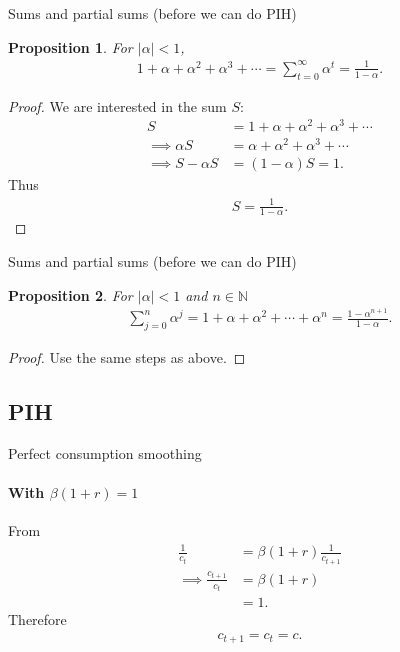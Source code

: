 \documentclass[presentation,dvipsnames]{beamer}
\newtheorem{prop}{Proposition}
\begin{document}
\begin{frame}[label=sec-2-3]{Sums and partial sums (before we can do PIH)}
\begin{prop}
\label{prop:2}
For $|\alpha| < 1$,
\begin{align*}
1 + \alpha + \alpha^{2} + \alpha^{3} + \cdots = \sum\limits_{t=0}^{\infty} \alpha^{t} = \frac{1}{1-\alpha}.
\end{align*}
\end{prop}
\begin{proof}
We are interested in the sum $S$:
\begin{align*}
S &= 1 + \alpha + \alpha^{2} + \alpha^{3} + \cdots \\
\implies \alpha S &= \alpha + \alpha^{2} + \alpha^{3} + \cdots \\
\implies S - \alpha S &= (1-\alpha)S = 1.
\end{align*}
Thus
\begin{align*}
S = \frac{1}{1-\alpha}.
\end{align*}
\end{proof}
\end{frame}

\begin{frame}[label=sec-2-3]{Sums and partial sums (before we can do PIH)}
\begin{prop}
\label{prop:2}
For $|\alpha| < 1$ and $n \in \mathbb{N}$
\begin{align*}
\sum\limits_{j=0}^{n} \alpha^{j} = 1+\alpha + \alpha^{2} + \cdots + \alpha^{n} = \frac{1-\alpha^{n+1}}{1-\alpha}.
\end{align*}
\end{prop}
\begin{proof}
Use the same steps as above.
\end{proof}
\end{frame}

\subsection{PIH}
\begin{frame}[label=sec-2-4]{Perfect consumption smoothing}
\framesubtitle{With $\beta (1+r) = 1$}
From
\begin{align*}
\frac{1}{c_{t}} &= \beta (1+r) \frac{1}{c_{t+1}} \\
\implies \frac{c_{t+1}}{c_{t}} &= \beta (1+r) \\
&= 1.
\end{align*}
Therefore
\begin{align*}
c_{t+1} = c_{t} = c.
\end{align*}
\end{frame}
\end{document}
